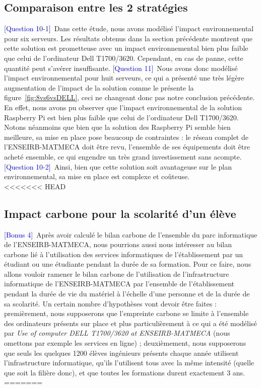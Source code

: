 \documentclass[12pt,a4paper]{paper}
\begin{document}
\subsection{Comparaison entre les 2 stratégies}
\textcolor{blue}{[Question 10-1]}~Dans cette étude, nous avons modélisé l'impact environnemental pour six serveurs. Les résultats obtenus dans la section précédente montrent que cette solution est prometteuse avec un impact environnemental bien plus faible que celui de l'ordinateur Dell T1700/3620. Cependant, en cas de panne, cette quantité peut s'avérer insuffisante. \textcolor{blue}{[Question 11]}~Nous avons donc modélisé l'impact environnemental pour huit serveurs, ce qui a présenté une très légère augmentation de l'impact de la solution comme le présente la figure~\ref{fig:8vs6vsDELL}, ceci ne changeant donc pas notre conclusion précédente. En effet, nous avons pu observer que l'impact environnemental de la solution Raspberry Pi est bien plus faible que celui de l'ordinateur Dell T1700/3620.\\
Notons néanmoins que bien que la solution des Raspberry Pi semble bien meilleure, sa mise en place pose beaucoup de contraintes : le réseau complet de l'ENSEIRB-MATMECA doit être revu, l'ensemble de ses équipements doit être acheté ensemble, ce qui engendre un très grand investissement sans acompte. \\
\textcolor{blue}{[Question 10-2]}~Ainsi, bien que cette solution soit avantageuse sur le plan environnemental, sa mise en place est complexe et coûteuse.\\

<<<<<<< HEAD
\subsection{Impact carbone pour la scolarité d'un élève}
\textcolor{blue}{[Bonus 4]}~Après avoir calculé le bilan carbone de l'ensemble du parc informatique de l'ENSEIRB-MATMECA, nous pourrions aussi nous intéresser au bilan carbone lié à l'utilisation des services informatiques de l'établissement par un étudiant ou une étudiante pendant la durée de sa formation. Pour ce faire, nous allons vouloir ramener le bilan carbone de l'utilisation de l'infrastructure informatique de l'ENSEIRB-MATMECA par l'ensemble de l'établissement pendant la durée de vie du matériel à l'échelle d'une personne et de la durée de sa scolarité. Un certain nombre d'hypothèses vont devoir être faites : premièrement, nous supposerons que l'empreinte carbone se limite à l'ensemble des ordinateurs présents sur place et plus particulièrement à ce qui a été modélisé par \textit{Use of computer DELL T1700/3620 at ENSEIRB-MATMECA} (nous omettons par exemple les services en ligne) ; deuxièmement, nous supposerons que seuls les quelques 1200 élèves ingénieurs présents chaque année utilisent l'infrastructure informatique, qu'ils l'utilisent tous avec la même intensité (quelle que soit la filière donc), et que toutes les formations durent exactement 3 ans.
=======
\end{document}
